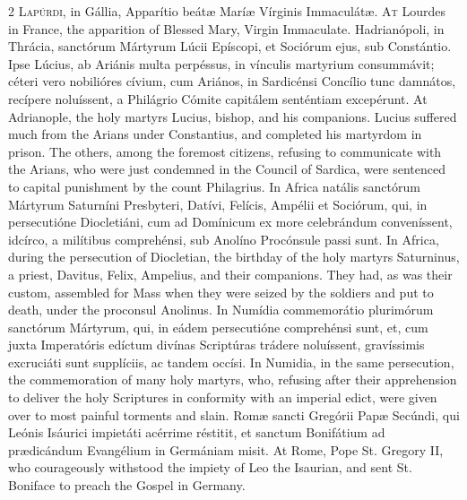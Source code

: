 \begin{paracol}{2}
\lettrine[lines=2]{L}{apúrdi,} in Gállia, Apparítio beátæ Maríæ 
 Vírginis Immaculátæ.
\switchcolumn
{}
\lettrine[lines=2]{A}{t} Lourdes in France, the apparition of Blessed Mary, Virgin Immaculate.
\switchcolumn*
{}
Hadrianópoli, in Thrácia, sanctórum Mártyrum Lúcii Epíscopi, et Sociórum 
 ejus, sub Constántio. Ipse Lúcius, ab Ariánis multa perpéssus, in 
 vínculis martyrium consummávit; céteri vero nobilióres cívium, cum Ariános, 
 in Sardicénsi Concílio tunc damnátos, recípere noluíssent, a Philágrio 
 Cómite capitálem senténtiam excepérunt.
\switchcolumn
{}
At Adrianople, the holy martyrs Lucius, bishop, and his companions. 
 Lucius suffered much from the Arians under Constantius, and completed his 
 martyrdom in prison. The others, among the foremost citizens, refusing 
 to communicate with the Arians, who were just condemned in the Council of 
 Sardica, were sentenced to capital punishment by the count Philagrius.
\switchcolumn*
{}
In Africa natális sanctórum Mártyrum Saturníni Presbyteri, Datívi, Felícis, 
 Ampélii et Sociórum, qui, in persecutióne Diocletiáni, cum ad Domínicum ex 
 more celebrándum conveníssent, idcírco, a milítibus comprehénsi, sub Anolíno 
 Procónsule passi sunt.
\switchcolumn
{}
In Africa, during the persecution of Diocletian, the birthday of the holy 
 martyrs Saturninus, a priest, Davitus, Felix, Ampelius, and their 
 companions. They had, as was their custom, assembled for Mass when 
 they were seized by the soldiers and put to death, under the proconsul 
 Anolinus.
\switchcolumn*
{}
In Numídia commemorátio plurimórum sanctórum Mártyrum, qui, in 
 eádem 
 persecutióne comprehénsi sunt, et, cum juxta Imperatóris edíctum divínas 
 Scriptúras trádere noluíssent, gravíssimis excruciáti sunt supplíciis, ac 
 tandem occísi.
\switchcolumn
{}
In Numidia, in the same persecution, the commemoration of many holy martyrs, 
 who, refusing after their apprehension to deliver the holy Scriptures in 
 conformity with an imperial edict, were given over to most painful torments 
 and slain.
\switchcolumn*
{}
Romæ sancti Gregórii Papæ Secúndi, qui Leónis 
 Isáurici impietáti acérrime réstitit, et sanctum Bonifátium ad prædicándum 
 Evangélium in Germániam misit.
\switchcolumn
{}
At Rome, Pope St. Gregory II, who courageously withstood the impiety of Leo 
 the Isaurian, and sent St. Boniface to preach the Gospel in Germany.

\end{paracol}
